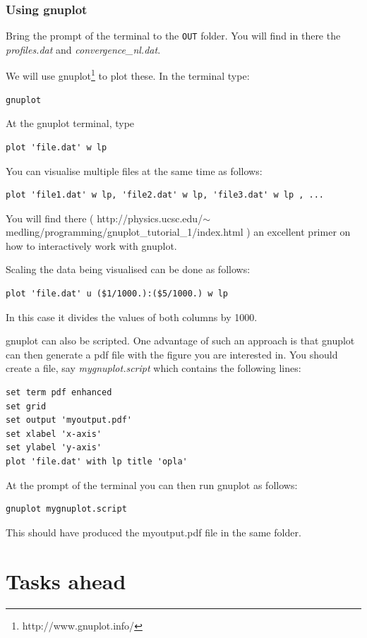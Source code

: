 \documentclass[a4paper]{article}
\begin{document}
\subsubsection{Using gnuplot}

Bring the prompt of the terminal to the {\tt OUT} folder. You will find in there the 
{\sl profiles.dat} and {\sl convergence\_nl.dat}.

We will use gnuplot\footnote{http://www.gnuplot.info/} to plot these. In the terminal type:
\begin{verbatim}
gnuplot
\end{verbatim}
At the gnuplot terminal, type
\begin{verbatim}
plot 'file.dat' w lp 
\end{verbatim}

You can visualise multiple files at the same time as follows:
\begin{verbatim}
plot 'file1.dat' w lp, 'file2.dat' w lp, 'file3.dat' w lp , ... 
\end{verbatim}
You will find there ( http://physics.ucsc.edu/$\sim$medling/programming/gnuplot\_tutorial\_1/index.html ) an excellent primer on how to interactively work with gnuplot.

Scaling the data being visualised can be done as follows:
\begin{verbatim}
plot 'file.dat' u ($1/1000.):($5/1000.) w lp
\end{verbatim}
In this case it divides the values of both columns by 1000.

gnuplot can also be scripted. One advantage of such an approach is that gnuplot can then generate a pdf file with the figure you are interested in. You should create a file, say {\sl mygnuplot.script} which contains the following lines:
\begin{verbatim}
set term pdf enhanced
set grid
set output 'myoutput.pdf'
set xlabel 'x-axis'
set ylabel 'y-axis'
plot 'file.dat' with lp title 'opla'
\end{verbatim}

At the prompt of the terminal you can then run gnuplot as follows:
\begin{verbatim}
gnuplot mygnuplot.script
\end{verbatim}
This should have produced the myoutput.pdf file in the same folder.

\section{Tasks ahead}
\end{document}
